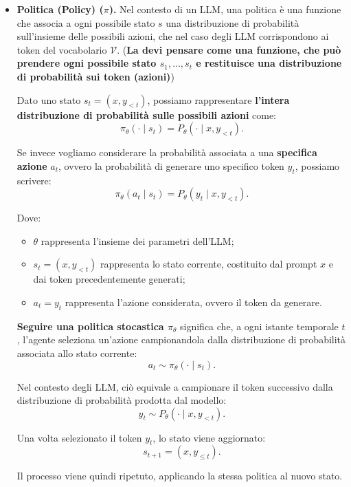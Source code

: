 \begin{itemize}
    In questi casi, possiamo utilizzare:
    \[
        r(s_t,a_t)
    \]
    come notazione abbreviata di $r(s_t,a_t,s_{t+1})$.

    \item \textbf{Politica (Policy) ($\pi$).}
Nel contesto di un LLM, una politica è una funzione che associa
a ogni possibile stato $s$ una distribuzione di probabilità
sull'insieme delle possibili azioni, che nel caso degli LLM
corrispondono ai token del vocabolario $\mathcal{V}$. (\textbf{La devi pensare come una funzione, che può prendere ogni possibile stato $s_1,\dots,s_t$ e restituisce una distribuzione di probabilità sui token (azioni)})

Dato uno stato $s_t=(x,y_{<t})$, possiamo rappresentare
\textbf{l'intera distribuzione di probabilità sulle possibili azioni}
come:
\[
    \pi_\theta(\cdot \mid s_t)
    = P_\theta(\cdot \mid x,y_{<t}).
\]

Se invece vogliamo considerare la probabilità associata a
una \textbf{specifica azione} $a_t$, ovvero la probabilità
di generare uno specifico token $y_t$, possiamo scrivere:
\[
    \pi_\theta(a_t \mid s_t)
    = P_\theta(y_t \mid x,y_{<t}).
\]

Dove:
\begin{itemize}
    \item $\theta$ rappresenta l'insieme dei parametri dell'LLM;
    \item $s_t=(x,y_{<t})$ rappresenta lo stato corrente,
    costituito dal prompt $x$ e dai token precedentemente generati;
    \item $a_t=y_t$ rappresenta l'azione considerata,
    ovvero il token da generare.
\end{itemize}

\textbf{Seguire una politica stocastica $\pi_\theta$} significa
che, a ogni istante temporale $t$, l'agente seleziona un'azione
campionandola dalla distribuzione di probabilità associata
allo stato corrente:
\[
    a_t \sim \pi_\theta(\cdot \mid s_t).
\]

Nel contesto degli LLM, ciò equivale a campionare il token
successivo dalla distribuzione di probabilità prodotta dal modello:
\[
    y_t \sim P_\theta(\cdot \mid x,y_{<t}).
\]

Una volta selezionato il token $y_t$, lo stato viene aggiornato:
\[
    s_{t+1}=(x,y_{\leq t}).
\]

Il processo viene quindi ripetuto, applicando la stessa politica
al nuovo stato.

    


\end{itemize}
